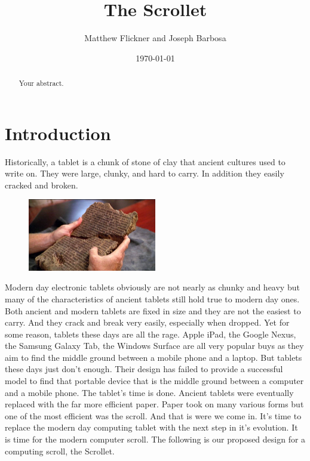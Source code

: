 \documentclass[a4paper]{article}
\title{The Scrollet}
\author{Matthew Flickner and Joseph Barbosa}
\date{\today}
\begin{document}
\maketitle

\begin{abstract}
Your abstract.
\end{abstract}


\section{Introduction}
Historically, a tablet is a chunk of stone of clay that ancient cultures used to write on. They were large, clunky, and hard to carry. In addition they easily cracked and broken.
\begin{figure}[H]
\centering
\includegraphics[width=0.5\textwidth]{ancienttablet.jpg}
\end{figure}
Modern day electronic tablets obviously are not nearly as chunky and heavy but many of the characteristics of ancient tablets still hold true to modern day ones. Both ancient and modern tablets are fixed in size and they are not the easiest to carry. And they crack and break very easily, especially when dropped. Yet for some reason, tablets these days are all the rage. Apple iPad, the Google Nexus, the Samsung Galaxy Tab, the Windows Surface are all very popular buys as they aim to find the middle ground between a mobile phone and a laptop. But tablets these days just don't enough. Their design has failed to provide a successful model to find that portable device that is the middle ground between a computer and a mobile phone. The tablet's time is done. Ancient tablets were eventually replaced with the far more efficient paper. Paper took on many various forms but one of the most efficient was the scroll. And that is were we come in. It's time to replace the modern day computing tablet with the next step in it's evolution. It is time for the modern computer scroll. The following is our proposed design for a computing scroll, the Scrollet.
\end{document}
